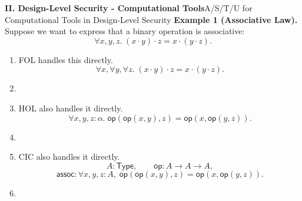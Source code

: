 \documentclass[10pt,aspectratio=1610,compress,dvipsnames]{beamer}
\begin{document}
\begin{frame}[fragile]{\bfseries II. Design-Level Security - Computational Tools}{A/S/T/U for Computational Tools in Design-Level Security}
\textbf{Example 1 (Associative Law).}\;	Suppose we want to express that a binary operation is associative: 	\[
\boxed{\forall x,y,z.\;(x\cdot y)\cdot z = x\cdot(y\cdot z).}
\]
\begin{enumerate}[$\bullet$]
	\item[FOL] FOL handles this directly. $$\forall x,\forall y,\forall z.\;(x\cdot y)\cdot z = x\cdot(y\cdot z).$$
	\item[]
	\item[HOL] HOL also handles it directly. $$\forall x,y,z:\alpha.\; \mathsf{op}(\mathsf{op}(x,y),z) = \mathsf{op}(x,\mathsf{op}(y,z)).$$ 
	\item[]
	\item[CIC] CIC also handles it directly. \[
	A:\mathsf{Type},\qquad \mathsf{op}:A\to A\to A,
	\]
	\[
	\mathsf{assoc}:\forall x,y,z:A,\; \mathsf{op}(\mathsf{op}(x,y),z) = \mathsf{op}(x,\mathsf{op}(y,z)).
	\]
	\item[] 
\end{enumerate}
\end{frame}
\end{document}
